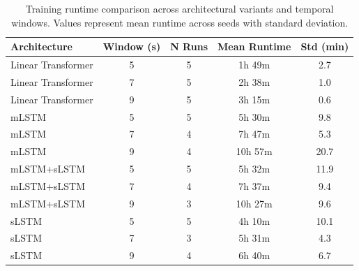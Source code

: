 \begin{table}[htbp]
\centering
\footnotesize
\caption{Training runtime comparison across architectural variants and temporal windows. Values represent mean runtime across seeds with standard deviation.}
\label{tab:runtime_comparison}
\begin{tabular}{l | c | c | c | c}
\hline
\textbf{Architecture} & \textbf{Window (s)} & \textbf{N Runs} & \textbf{Mean Runtime} & \textbf{Std (min)} \\
\hline
Linear Transformer & 5 & 5 & 1h 49m & 2.7 \\
Linear Transformer & 7 & 5 & 2h 38m & 1.0 \\
Linear Transformer & 9 & 5 & 3h 15m & 0.6 \\
\hline
mLSTM & 5 & 5 & 5h 30m & 9.8 \\
mLSTM & 7 & 4 & 7h 47m & 5.3 \\
mLSTM & 9 & 4 & 10h 57m & 20.7 \\
\hline
mLSTM+sLSTM & 5 & 5 & 5h 32m & 11.9 \\
mLSTM+sLSTM & 7 & 4 & 7h 37m & 9.4 \\
mLSTM+sLSTM & 9 & 3 & 10h 27m & 9.6 \\
\hline
sLSTM & 5 & 5 & 4h 10m & 10.1 \\
sLSTM & 7 & 3 & 5h 31m & 4.3 \\
sLSTM & 9 & 4 & 6h 40m & 6.7 \\
\hline
\end{tabular}
\end{table}